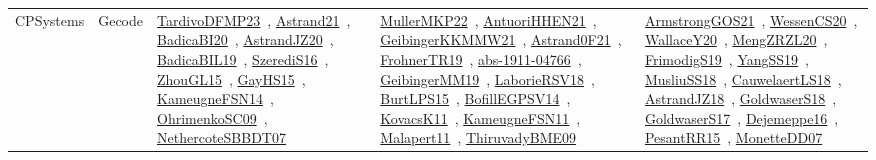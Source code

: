 {\begin{longtable}{lp{3cm}>{\raggedright\arraybackslash}p{6cm}>{\raggedright\arraybackslash}p{6cm}>{\raggedright\arraybackslash}p{8cm}}
CPSystems & Gecode & \href{works/TardivoDFMP23.pdf}{TardivoDFMP23}~\cite{TardivoDFMP23}, \href{works/Astrand21.pdf}{Astrand21}~\cite{Astrand21}, \href{works/BadicaBI20.pdf}{BadicaBI20}~\cite{BadicaBI20}, \href{works/AstrandJZ20.pdf}{AstrandJZ20}~\cite{AstrandJZ20}, \href{works/BadicaBIL19.pdf}{BadicaBIL19}~\cite{BadicaBIL19}, \href{works/SzerediS16.pdf}{SzerediS16}~\cite{SzerediS16}, \href{works/ZhouGL15.pdf}{ZhouGL15}~\cite{ZhouGL15}, \href{works/GayHS15.pdf}{GayHS15}~\cite{GayHS15}, \href{works/KameugneFSN14.pdf}{KameugneFSN14}~\cite{KameugneFSN14}, \href{works/OhrimenkoSC09.pdf}{OhrimenkoSC09}~\cite{OhrimenkoSC09}, \href{works/NethercoteSBBDT07.pdf}{NethercoteSBBDT07}~\cite{NethercoteSBBDT07} & \href{works/MullerMKP22.pdf}{MullerMKP22}~\cite{MullerMKP22}, \href{works/AntuoriHHEN21.pdf}{AntuoriHHEN21}~\cite{AntuoriHHEN21}, \href{works/GeibingerKKMMW21.pdf}{GeibingerKKMMW21}~\cite{GeibingerKKMMW21}, \href{works/Astrand0F21.pdf}{Astrand0F21}~\cite{Astrand0F21}, \href{works/FrohnerTR19.pdf}{FrohnerTR19}~\cite{FrohnerTR19}, \href{works/abs-1911-04766.pdf}{abs-1911-04766}~\cite{abs-1911-04766}, \href{works/GeibingerMM19.pdf}{GeibingerMM19}~\cite{GeibingerMM19}, \href{works/LaborieRSV18.pdf}{LaborieRSV18}~\cite{LaborieRSV18}, \href{works/BurtLPS15.pdf}{BurtLPS15}~\cite{BurtLPS15}, \href{works/BofillEGPSV14.pdf}{BofillEGPSV14}~\cite{BofillEGPSV14}, \href{works/KovacsK11.pdf}{KovacsK11}~\cite{KovacsK11}, \href{works/KameugneFSN11.pdf}{KameugneFSN11}~\cite{KameugneFSN11}, \href{works/Malapert11.pdf}{Malapert11}~\cite{Malapert11}, \href{works/ThiruvadyBME09.pdf}{ThiruvadyBME09}~\cite{ThiruvadyBME09} & \href{works/ArmstrongGOS21.pdf}{ArmstrongGOS21}~\cite{ArmstrongGOS21}, \href{works/WessenCS20.pdf}{WessenCS20}~\cite{WessenCS20}, \href{works/WallaceY20.pdf}{WallaceY20}~\cite{WallaceY20}, \href{works/MengZRZL20.pdf}{MengZRZL20}~\cite{MengZRZL20}, \href{works/FrimodigS19.pdf}{FrimodigS19}~\cite{FrimodigS19}, \href{works/YangSS19.pdf}{YangSS19}~\cite{YangSS19}, \href{works/MusliuSS18.pdf}{MusliuSS18}~\cite{MusliuSS18}, \href{works/CauwelaertLS18.pdf}{CauwelaertLS18}~\cite{CauwelaertLS18}, \href{works/AstrandJZ18.pdf}{AstrandJZ18}~\cite{AstrandJZ18}, \href{works/GoldwaserS18.pdf}{GoldwaserS18}~\cite{GoldwaserS18}, \href{works/GoldwaserS17.pdf}{GoldwaserS17}~\cite{GoldwaserS17}, \href{works/Dejemeppe16.pdf}{Dejemeppe16}~\cite{Dejemeppe16}, \href{works/PesantRR15.pdf}{PesantRR15}~\cite{PesantRR15}, \href{works/MonetteDD07.pdf}{MonetteDD07}~\cite{MonetteDD07}\\

\end{longtable}}
